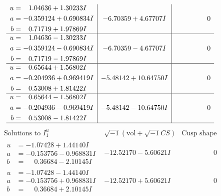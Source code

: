 \documentclass[1p]{elsarticle_modified}
\theoremstyle{definition}
\newcommand{\I}{\sqrt{-1}}
\begin{document}
$$\begin{array}{c|c|c}
\begin{aligned}
u &= \phantom{-}1.04636 + 1.30233 I \\
a &= -0.359124 + 0.690834 I \\
b &= \phantom{-}0.71719 + 1.97869 I\end{aligned}
 & -6.70359 + 4.67707 I & \phantom{-0.000000 } 0 \\ \hline\begin{aligned}
u &= \phantom{-}1.04636 - 1.30233 I \\
a &= -0.359124 - 0.690834 I \\
b &= \phantom{-}0.71719 - 1.97869 I\end{aligned}
 & -6.70359 - 4.67707 I & \phantom{-0.000000 } 0 \\ \hline\begin{aligned}
u &= \phantom{-}0.65644 + 1.56802 I \\
a &= -0.204936 + 0.969419 I \\
b &= \phantom{-}0.53008 + 1.81422 I\end{aligned}
 & -5.48142 + 10.64750 I & \phantom{-0.000000 } 0 \\ \hline\begin{aligned}
u &= \phantom{-}0.65644 - 1.56802 I \\
a &= -0.204936 - 0.969419 I \\
b &= \phantom{-}0.53008 - 1.81422 I\end{aligned}
 & -5.48142 - 10.64750 I & \phantom{-0.000000 } 0\\
 \hline 
 \end{array}$$\newpage$$\begin{array}{c|c|c}  
\text{Solutions to }I^u_{1}& \I (\text{vol} + \sqrt{-1}CS) & \text{Cusp shape}\\
 \hline 
\begin{aligned}
u &= -1.07428 + 1.44140 I \\
a &= -0.153756 - 0.968831 I \\
b &= \phantom{-}0.36684 - 2.10145 I\end{aligned}
 & -12.52170 - 5.60621 I & \phantom{-0.000000 } 0 \\ \hline\begin{aligned}
u &= -1.07428 - 1.44140 I \\
a &= -0.153756 + 0.968831 I \\
b &= \phantom{-}0.36684 + 2.10145 I\end{aligned}
 & -12.52170 + 5.60621 I & \phantom{-0.000000 } 0 \\ \hline\begin{aligned}

\end{aligned}
\end{array}$$
\end{document}
